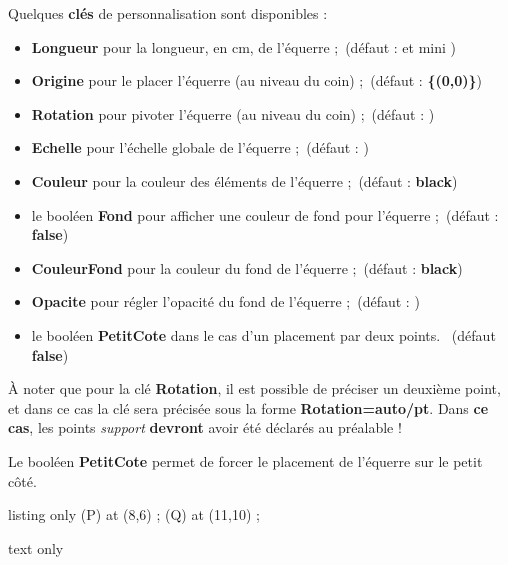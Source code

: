 \documentclass[french,a4paper,11pt]{article}
\newcommand\Cle[1]{{\bfseries\sffamily\textlangle #1\textrangle}}
\newcommand\affichegrille[4]{%
	\draw[xstep=1,ystep=1,lightgray] (#1,#3) grid (#2,#4) ;
	\foreach \x in {#1,\inteval{1+#1},...,#2} \draw[lightgray] (\x,#4)--++(0,3pt) node[font=\scriptsize,above] {$\x$} ;
	\foreach \y in {#3,\inteval{1+#3},...,#4} \draw[lightgray] (#1,\y)--++(-3pt,0) node[font=\scriptsize,left] {$\y$} ;
}
\newcommand\pointsutiles[1]{%
	\foreach \point in {#1} {\draw[thick,fill=red] \point circle[radius=3pt] ;}
}
\begin{document}
\begin{tipblock}
Quelques \Cle{clés} de personnalisation sont disponibles :

\begin{itemize}
	\item \Cle{Longueur} pour la longueur, en cm, de l'équerre ;\hfill~(défaut : \Cle{10} et mini \Cle{4.5})
	\item \Cle{Origine} pour le placer l'équerre (au niveau du coin) ;\hfill~(défaut : \Cle{\{(0,0)\}})
	\item \Cle{Rotation} pour pivoter l'équerre (au niveau du coin) ;\hfill~(défaut : \Cle{0})
	\item \Cle{Echelle} pour l'échelle globale de l'équerre ;\hfill~(défaut : \Cle{1})
	\item \Cle{Couleur} pour la couleur des éléments de l'équerre ;\hfill~(défaut : \Cle{black})
	\item le booléen \Cle{Fond} pour afficher une couleur de fond pour l'équerre ;\hfill~(défaut : \Cle{false})
	\item \Cle{CouleurFond} pour la couleur du fond de l'équerre ;\hfill~(défaut : \Cle{black})
	\item \Cle{Opacite} pour régler l'opacité du fond de l'équerre ;\hfill~(défaut : \Cle{0.5})
	\item le booléen \Cle{PetitCote} dans le cas d'un placement par deux points. \hfill~(défaut \Cle{false})
\end{itemize}

À noter que pour la clé \Cle{Rotation}, il est possible de préciser un deuxième point, et dans ce cas la clé sera précisée sous la forme \Cle{Rotation=auto/pt}. Dans \textbf{ce cas}, les points \textit{support} \textbf{devront} avoir été déclarés au préalable !

Le booléen \Cle{PetitCote} permet de forcer le placement de l'équerre sur le petit côté.
\end{tipblock}

\begin{PresentationCode}{listing only}
\coordinate (P) at (8,6) ;
\coordinate (Q) at (11,10) ;
\tkzEquerre[Fond]
\tkzEquerre[Echelle=0.61,Origine=P,Couleur=DarkBlue,Rotation=auto/Q]
\tkzEquerre[Longueur=10,Origine={(2.5,-1)},Couleur=red,Rotation=-105]
\end{PresentationCode}

\begin{PresentationCode}{text only}
\end{PresentationCode}
\end{document}
